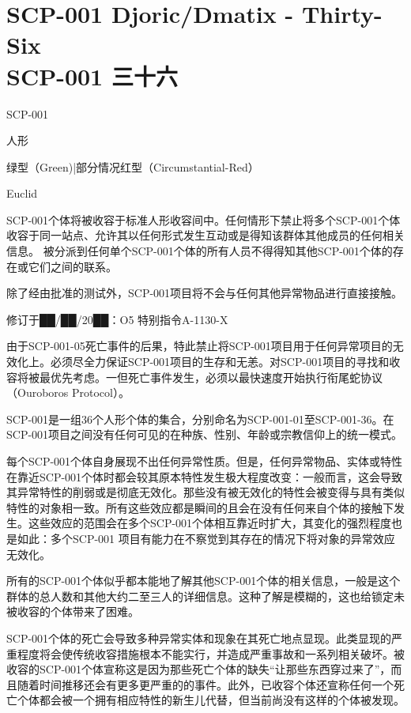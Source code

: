 \chapter[SCP-001 三十六]{
	SCP-001 Djoric/Dmatix - Thirty-Six \\
	SCP-001 三十六
}

\label{chap:SCP-001.thirty.six}

 SCP-001

人形

 绿型（Green)|部分情况红型（Circumstantial-Red）

 Euclid

SCP-001个体将被收容于标准人形收容间中。任何情形下禁止将多个SCP-001个体收容于同一站点、允许其以任何形式发生互动或是得知该群体其他成员的任何相关信息。 被分派到任何单个SCP-001个体的所有人员不得得知其他SCP-001个体的存在或它们之间的联系。

除了经由批准的测试外，SCP-001项目将不会与任何其他异常物品进行直接接触。

修订于██/██/20██：O5 特别指令A-1130-X

由于SCP-001-05死亡事件的后果，特此禁止将SCP-001项目用于任何异常项目的无效化上。必须尽全力保证SCP-001项目的生存和无恙。对SCP-001项目的寻找和收容将被最优先考虑。一但死亡事件发生，必须以最快速度开始执行衔尾蛇协议（Ouroboros Protocol）。

SCP-001是一组36个人形个体的集合，分别命名为SCP-001-01至SCP-001-36。在SCP-001项目之间没有任何可见的在种族、性别、年龄或宗教信仰上的统一模式。

每个SCP-001个体自身展现不出任何异常性质。但是，任何异常物品、实体或特性在靠近SCP-001个体时都会较其原本特性发生极大程度改变：一般而言，这会导致其异常特性的削弱或是彻底无效化。那些没有被无效化的特性会被变得与具有类似特性的对象相一致。所有这些效应都是瞬间的且会在没有任何来自个体的接触下发生。这些效应的范围会在多个SCP-001个体相互靠近时扩大，其变化的强烈程度也是如此：多个SCP-001 项目有能力在不察觉到其存在的情况下将对象的异常效应无效化。

所有的SCP-001个体似乎都本能地了解其他SCP-001个体的相关信息，一般是这个群体的总人数和其他大约二至三人的详细信息。这种了解是模糊的，这也给锁定未被收容的个体带来了困难。

SCP-001个体的死亡会导致多种异常实体和现象在其死亡地点显现。此类显现的严重程度将会使传统收容措施根本不能实行，并造成严重事故和一系列相关破坏。被收容的SCP-001个体宣称这是因为那些死亡个体的缺失“让那些东西穿过来了”，而且随着时间推移还会有更多更严重的的事件。此外，已收容个体还宣称任何一个死亡个体都会被一个拥有相应特性的新生儿代替，但当前尚没有这样的个体被发现。

